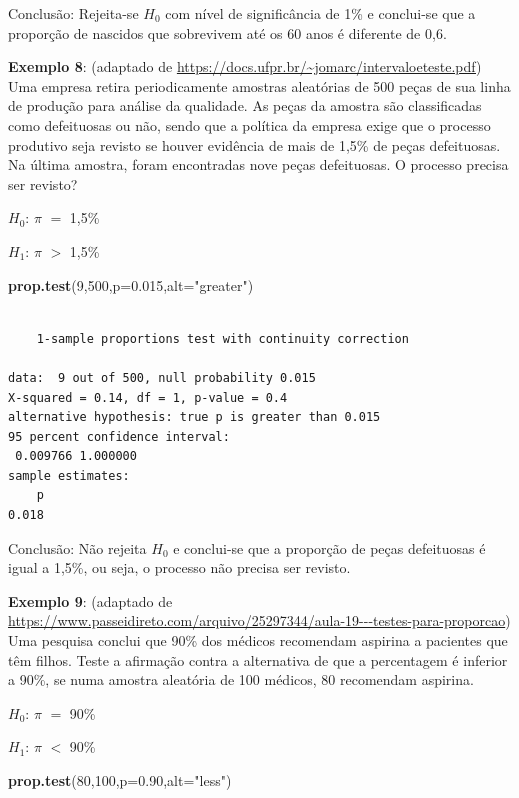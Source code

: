 \documentclass[12pt,brazil,oneside]{book}
\newenvironment{Shaded}{\begin{snugshade}}{\end{snugshade}}
\newcommand{\DataTypeTok}[1]{\textcolor[rgb]{0.13,0.29,0.53}{#1}}
\newcommand{\DecValTok}[1]{\textcolor[rgb]{0.00,0.00,0.81}{#1}}
\newcommand{\FloatTok}[1]{\textcolor[rgb]{0.00,0.00,0.81}{#1}}
\newcommand{\KeywordTok}[1]{\textcolor[rgb]{0.13,0.29,0.53}{\textbf{#1}}}
\newcommand{\NormalTok}[1]{#1}
\newcommand{\StringTok}[1]{\textcolor[rgb]{0.31,0.60,0.02}{#1}}
\begin{document}
Conclusão: Rejeita-se \(H_0\) com nível de significância de 1\% e conclui-se que a proporção de nascidos que sobrevivem até os 60 anos é diferente de 0,6.

\textbf{Exemplo 8}: (adaptado de \url{https://docs.ufpr.br/~jomarc/intervaloeteste.pdf}) Uma empresa retira periodicamente amostras aleatórias de 500 peças de sua linha de produção para análise da qualidade. As peças da amostra são classificadas como defeituosas ou não, sendo que a política da empresa exige que o processo produtivo seja revisto se houver evidência de mais de 1,5\% de peças defeituosas. Na última amostra, foram encontradas nove peças defeituosas. O processo precisa ser revisto?

\textbf{\(H_0\)}: \(\pi\) \(=\) 1,5\%

\textbf{\(H_1\)}: \(\pi\) \(>\) 1,5\%

\begin{Shaded}
\begin{Highlighting}[]
\KeywordTok{prop.test}\NormalTok{(}\DecValTok{9}\NormalTok{,}\DecValTok{500}\NormalTok{,}\DataTypeTok{p=}\FloatTok{0.015}\NormalTok{,}\DataTypeTok{alt=}\StringTok{"greater"}\NormalTok{)}
\end{Highlighting}
\end{Shaded}

\begin{verbatim}

    1-sample proportions test with continuity correction

data:  9 out of 500, null probability 0.015
X-squared = 0.14, df = 1, p-value = 0.4
alternative hypothesis: true p is greater than 0.015
95 percent confidence interval:
 0.009766 1.000000
sample estimates:
    p 
0.018 
\end{verbatim}

Conclusão: Não rejeita \(H_0\) e conclui-se que a proporção de peças defeituosas é igual a 1,5\%, ou seja, o processo não precisa ser revisto.

\textbf{Exemplo 9}: (adaptado de \url{https://www.passeidireto.com/arquivo/25297344/aula-19---testes-para-proporcao}) Uma pesquisa conclui que 90\% dos médicos recomendam aspirina a pacientes que têm filhos. Teste a afirmação contra a alternativa de que a percentagem é inferior a 90\%, se numa amostra aleatória de 100 médicos, 80 recomendam aspirina.

\textbf{\(H_0\)}: \(\pi\) \(=\) 90\%

\textbf{\(H_1\)}: \(\pi\) \(<\) 90\%

\begin{Shaded}
\begin{Highlighting}[]
\KeywordTok{prop.test}\NormalTok{(}\DecValTok{80}\NormalTok{,}\DecValTok{100}\NormalTok{,}\DataTypeTok{p=}\FloatTok{0.90}\NormalTok{,}\DataTypeTok{alt=}\StringTok{"less"}\NormalTok{)}
\end{Highlighting}
\end{Shaded}
\end{document}
